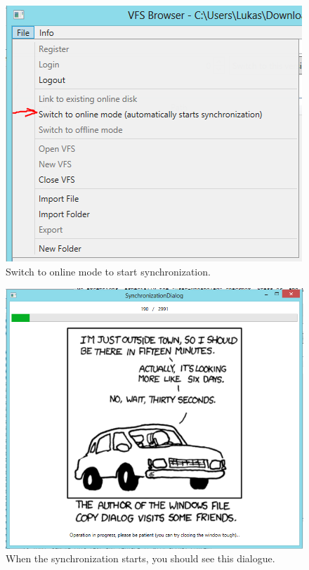 \documentclass[JCDReport.tex]{subfiles}
\begin{document}
\begin{figure}[h!]
	\centering
	\includegraphics[scale=1]{Images/tutorial/10.png} 
	\caption{Switch to online mode to start synchronization.}
\end{figure}

\begin{figure}[h!]
	\centering
	\includegraphics[scale=0.75]{Images/tutorial/11.png} 
	\caption{When the synchronization starts, you should see this dialogue.}
\end{figure}
\end{document}
